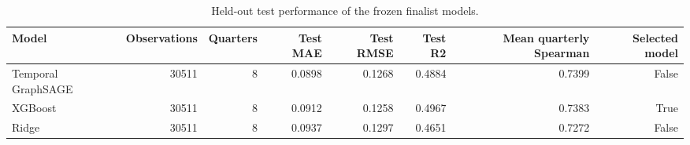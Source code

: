 \begin{table}
\caption{Held-out test performance of the frozen finalist models.}
\label{tab:final-models-test-performance}
\begin{tabular}{lrrrrrrr}
\toprule
Model & Observations & Quarters & Test MAE & Test RMSE & Test R2 & Mean quarterly Spearman & Selected model \\
\midrule
Temporal GraphSAGE & 30511 & 8 & 0.0898 & 0.1268 & 0.4884 & 0.7399 & False \\
XGBoost & 30511 & 8 & 0.0912 & 0.1258 & 0.4967 & 0.7383 & True \\
Ridge & 30511 & 8 & 0.0937 & 0.1297 & 0.4651 & 0.7272 & False \\
\bottomrule
\end{tabular}
\end{table}
